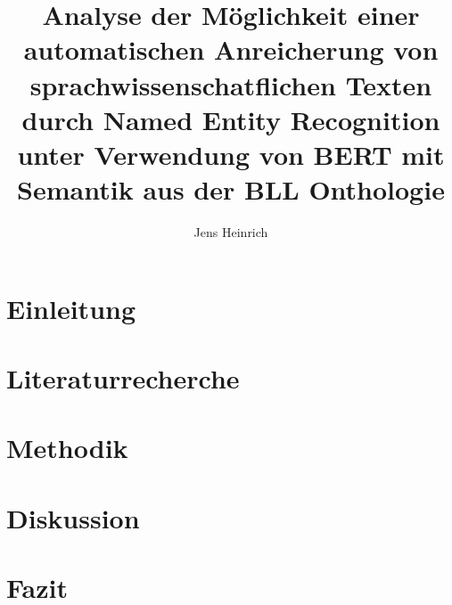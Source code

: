 \documentclass[
german,
]{bachelor}
\author{Jens Heinrich}
\title{%
Analyse der Möglichkeit
einer automatischen Anreicherung von sprachwissenschatflichen Texten
durch Named Entity Recognition
unter Verwendung von BERT
mit Semantik aus der BLL Onthologie%
}
\begin{document}
\maketitle

\section{Einleitung}

\section{Literaturrecherche}

\section{Methodik}

\section{Diskussion}

\section{Fazit}
\end{document}
